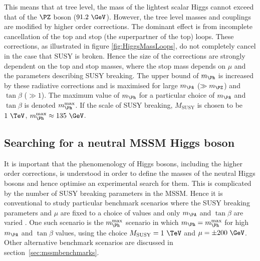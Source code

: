 This means that at tree level, the mass of the lightest scalar Higgs cannot
exceed that of the $\PZ$ boson ($91.2~\GeV$). However, the tree level masses and
couplings are modified by higher order corrections. The dominant effect is from
incomplete cancellation of the top and stop (the superpartner of the top) loops.
These corrections, as illustrated in figure \ref{fig:HiggsMassLoops}, do not
completely cancel in the case that SUSY is broken. Hence the size of the
corrections are strongly dependent on the top and stop masses, where the stop
mass depends on $\mu$ and the parameters describing SUSY breaking. The upper
bound of $m_{\Ph}$ is increased by these radiative corrections and is maximised
for large $m_{\PA}$ ($\gg m_{\PZ}$) and $\tan\beta$ ($\gg1$). The maximum value of
$m_{\Ph}$ for a particular choice of $m_{\PA}$ and $\tan\beta$ is denoted
$m_{\Ph}^{\text{max}}$. If the scale of SUSY breaking, $M_{\text{SUSY}}$ is
chosen to be $1~\TeV$, $m_{\Ph}^{\text{max}} \approx 135~\GeV$.

\subsection{Searching for a neutral MSSM Higgs boson}
\label{sec:LHCMSSMHiggs}

It is important that the phenomenology of Higgs bosons, including the higher
order corrections, is understood in order to define the masses of the neutral
Higgs bosons and hence optimise an experimental search for them. This is
complicated by the number of SUSY breaking parameters in the \ac{MSSM}. Hence it
is conventional to study particular benchmark scenarios where the SUSY breaking
parameters and $\mu$ are fixed to a choice of values and only $m_{\PA}$ and
$\tan\beta$ are varied \cite{Carena:2002es}. One such scenario is the $m_{\Ph}^{\text{max}}$ scenario
in which $m_{\Ph}=m_{\Ph}^{\text{max}}$ for high $m_{\PA}$ and $\tan\beta$
values, using the choice $M_{\text{SUSY}} = 1~\TeV$ and $\mu = \pm 200~\GeV$.
Other alternative benchmark scenarios are discussed in 
section~\ref{sec:mssmbenchmarks}. 

